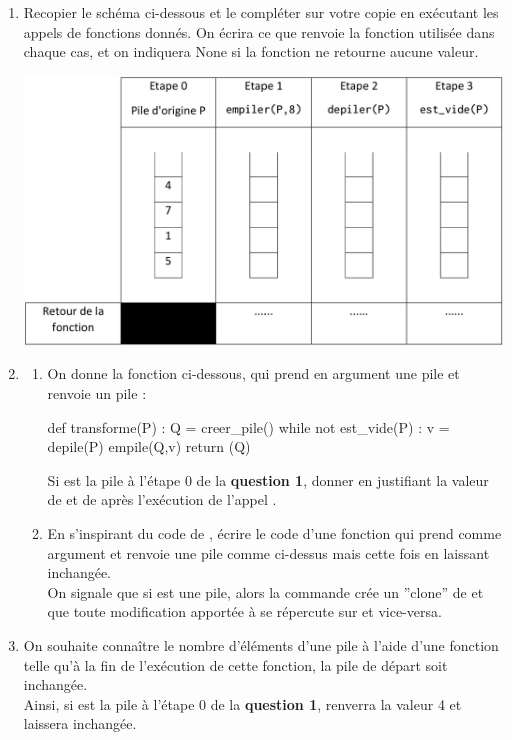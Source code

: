 \documentclass[11pt,a4paper,french,twoside]{PMCours}
\begin{document}
\begin{enumerate} 
    \item Recopier le schéma ci-dessous et le compléter sur votre copie en exécutant
    les appels de fonctions donnés. On écrira ce que renvoie la fonction utilisée
    dans chaque cas, et on indiquera None si la fonction ne retourne aucune
    valeur.
    \begin{center}
        \includegraphics[width=0.6\linewidth]{BacBlanc2Sujet1_NSI2122-img3.png}
    \end{center}
    \item \begin{enumerate}
    \item On donne la fonction ci-dessous, qui prend en argument une pile  et renvoie
    un pile  :
    \begin{Python}
    def transforme(P) :
        Q = creer_pile()
        while not est_vide(P) :
            v = depile(P)
            empile(Q,v)
        return (Q)
    \end{Python}
Si  est la pile à l'étape 0 de la {\bf question 1}, donner en justifiant la valeur de  et de  après l'exécution de l'appel  . 
    \item En s'inspirant du code de , écrire le code d'une fonction  qui prend comme argument  et renvoie une pile  comme ci-dessus mais cette fois en laissant  inchangée.\medskip\\
On signale que si  est une pile, alors la commande  crée un ''clone'' de  et que toute modification apportée à  se répercute sur  et vice-versa.
 \end{enumerate}    
    \item On souhaite connaître le nombre d'éléments d'une pile à l'aide d'une fonction  telle qu'à la fin de l'exécution de cette fonction, la pile de départ soit inchangée.\\
Ainsi, si  est la pile à l'étape 0 de la {\bf question 1},  renverra la valeur 4 et laissera  inchangée.
   

\end{enumerate}
\end{document}

